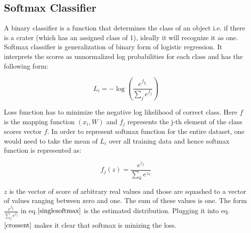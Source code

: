 \documentclass[11pt]{article}
\begin{document}
\subsection{Softmax Classifier}
A binary classifier is a function that determines the class of an object i.e. if there is a crater (which has an assigned class of 1), ideally it will recognize it as one. Softmax classifier is generalization of binary form of logistic regression. It interprets the scores as unnormalized log probabilities for each class and has the following form:

\begin{equation}
\label{singlesoftmax}
L_i = -\log\left(\frac{e^{f_{y_i}}}{ \sum_j e^{f_j} }\right) 
\end{equation}

Loss function has to minimize the negative log likelihood of correct class. Here $f$ is the mapping function $(x_i,W)$ and $f_j$ represents the j-th element of the class scores vector $f$. In order to represent softmax function for the entire dataset, one would need to take the mean of $L_i$ over all training data and hence softmax function is represented as:

\begin{equation}
f_j(z) = \frac{e^{z_j}}{\sum_k e^{z_k}}
\end{equation}

$z$ is the vector of score of arbitrary real values and those are squashed to a vector of values ranging between zero and one. The sum of these values is one. The form $\frac{e^{f_{y_i}}}{ \sum_j e^{f_j} }$ in eq.$\ref{singlesoftmax}$ is the estimated distribution. Plugging it into eq.$\ref{crossent}$ makes it clear that softmax is minizing the loss.
\end{document}

